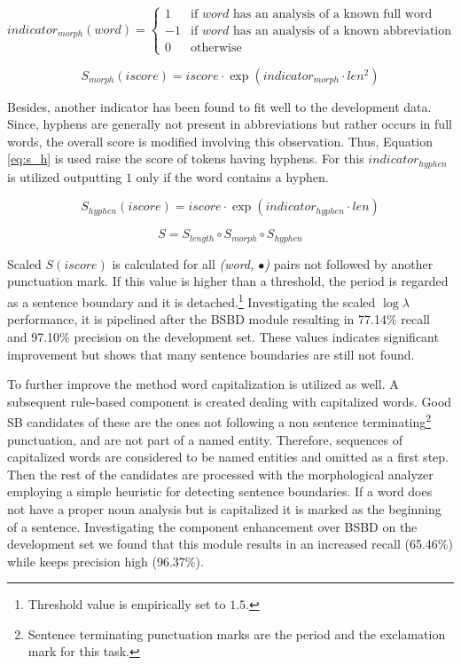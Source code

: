 \begin{equation}\label{eq:sign}
 indicator_{morph}(word) =
  \begin{cases}
   1  & \text{if $word$ has an analysis of a known full word} \\
   -1 & \text{if $word$ has an analysis of a known abbreviation} \\
   0  & \text{otherwise}
  \end{cases}
\end{equation}

\begin{equation} \label{eq:s_m}
S_{morph}(iscore)= iscore \cdot \exp{( indicator_{morph} \cdot len^2)}
\end{equation}

Besides, another indicator has been found to fit well to the development data. Since, hyphens are generally not present in abbreviations but rather occurs in full words, the overall score is modified involving this observation. Thus, Equation \eqref{eq:s_h} is used raise the score of tokens having hyphens. For this $indicator_{hyphen}$ is utilized outputting $1$ only if the word contains a hyphen. 


\begin{equation} \label{eq:s_h}
S_{hyphen}(iscore)= iscore \cdot \exp{(indicator_{hyphen} \cdot len)}
\end{equation}

\begin{equation}
S = S_{length} \circ S_{morph} \circ S_{hyphen}
\end{equation}

Scaled $S(iscore)$ is calculated for all \emph{(word, $\bullet$)} pairs not followed by another punctuation mark. If this value is higher than a threshold, the period is regarded as a sentence boundary and it is detached.\footnote{Threshold value is empirically set to $1.5$.}
Investigating the scaled $\log \lambda$ performance, it is pipelined after the BSBD module resulting in 77.14\% recall and 97.10\% precision on the development set. These values indicates significant improvement but shows that many sentence boundaries are still not found.

To further improve the method word capitalization is utilized as well. A subsequent rule-based component is created dealing with capitalized words. 
Good SB candidates of these are the ones not following a non sentence terminating\footnote{Sentence terminating punctuation marks are the period and the exclamation mark for this task.} punctuation, and are not part of a named entity. 
Therefore, sequences of capitalized words are considered to be named entities and omitted as a first step. Then the rest of the candidates are processed with the morphological analyzer employing a simple heuristic for detecting sentence boundaries. If a word does not have a proper noun analysis but is capitalized it is marked as the beginning of a sentence.  
Investigating the component enhancement over BSBD on the development set we found that this module results in an increased recall (65.46\%) while keeps precision high (96.37\%). 

